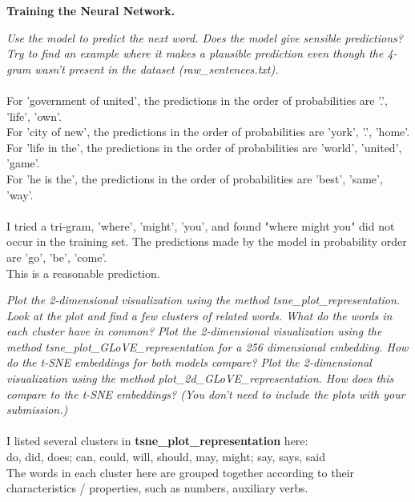 \documentclass{myhw}
\begin{document}
\begin{homeworkProblem}
\textbf{Training the Neural Network.}
\begin{homeworkSection}
\emph{Use the model to predict the next word. Does the model give sensible predictions? Try to find an example where it makes a plausible prediction even though the 4-gram wasn’t present in the dataset (raw\_sentences.txt). } \\
\\
For 'government of united', the predictions in the order of probabilities are '.', 'life', 'own'. \\
For 'city of new', the predictions in the order of probabilities are 'york', '.', 'home'.\\
For 'life in the', the predictions in the order of probabilities are 'world', 'united', 'game'.\\
For 'he is the', the predictions in the order of probabilities are 'best', 'same', 'way'. \\
\\
I tried a tri-gram, 'where', 'might', 'you', and found "where might you" did not occur in the training set. The predictions made by the model in probability order are 'go', 'be', 'come'. \\
This is a reasonable prediction.
\end{homeworkSection}
\begin{homeworkSection}
\emph{Plot the 2-dimensional visualization using the method tsne\_plot\_representation. Look at the plot and find a few clusters of related words. What do the words in each cluster have in common? Plot the 2-dimensional visualization using the method tsne\_plot\_GLoVE\_representation for a 256 dimensional embedding. How do the t-SNE embeddings for both models compare? Plot the 2-dimensional visualization using the method plot\_2d\_GLoVE\_representation. How does this compare to the t-SNE embeddings? (You don’t need to include the plots with your submission.)} \\
\\
I listed several clusters in \textbf{tsne\_plot\_representation} here: \\
do, did, does; 
can, could, will, should, may, might; 
say, says, said \\
The words in each cluster here are grouped together according to their characteristics / properties, such as numbers, auxiliary verbs. \\
\\

\end{homeworkSection}
\end{homeworkProblem}
\end{document}
